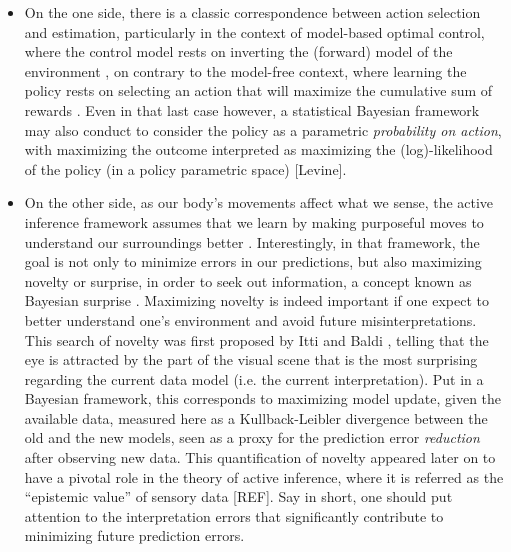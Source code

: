 \documentclass[10pt,letterpaper]{article}
\begin{document}
\begin{itemize}
\item On the one side, there is a classic correspondence between action selection and estimation, particularly in the context of model-based optimal control, where the control model rests on inverting the (forward) model of the environment \cite{todorov2001optimal,kording2004bayesian}, on contrary to the model-free context, where learning the policy rests on selecting an action that will maximize the cumulative sum of rewards \cite{sutton1998introduction}. %
Even in that last case however, a statistical Bayesian framework may also conduct to consider the policy as a parametric \emph{probability on action}, with maximizing the outcome interpreted as maximizing the (log)-likelihood of the policy (in a policy parametric space) [Levine]. %
\item On the other side, as our body's movements affect what we sense, the active inference framework assumes that we  learn by making purposeful moves to understand our surroundings better \cite{friston2012perceptions} . %
Interestingly, in that framework, the goal is not only to minimize errors in our predictions, but also maximizing novelty or surprise, in order to seek out information, a concept known as Bayesian surprise \cite{ITTI20091295}. Maximizing novelty  is indeed important if one expect to better understand one's environment and avoid future misinterpretations. This search of novelty %
was first proposed by Itti and Baldi \cite{ITTI20091295}, telling that the eye is attracted by the part of the visual scene that is the most surprising regarding the current data model (i.e. the current interpretation). Put in a Bayesian framework, this corresponds to maximizing model update, given the available data, measured here as a Kullback-Leibler divergence between the old and the new models, seen as a proxy for the prediction error \emph{reduction} after observing new data. This quantification of novelty appeared later on to have a pivotal role in the theory of active inference, where it is referred as the ``epistemic value'' of sensory data [REF]. Say in short, one should put attention to the interpretation errors that significantly contribute to minimizing future prediction errors. 


\end{itemize}
\end{document}
